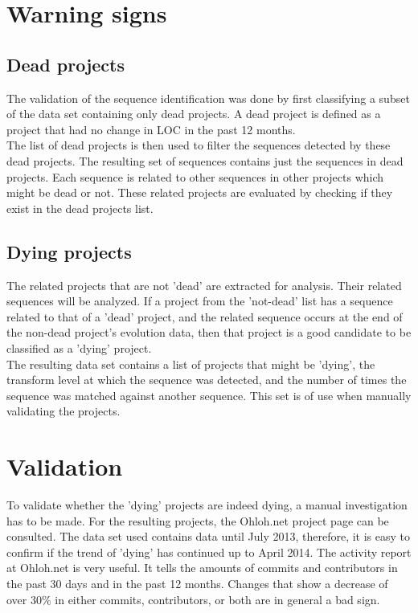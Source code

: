 \section{Warning signs}
\subsection{Dead projects}
The validation of the sequence identification was done by first classifying
a subset of the data set containing only dead projects. A dead project is
defined as a project that had no change in LOC in the past 12 months.\\

The list of dead projects is then used to filter the sequences detected by
these dead projects. The resulting set of sequences contains just the sequences
in dead projects. Each sequence is related to other sequences in other projects
which might be dead or not. These related projects are evaluated by checking if
they exist in the dead projects list.

\subsection{Dying projects}
The related projects that are not 'dead' are extracted for analysis. Their
related sequences will be analyzed. If a project from the 'not-dead' list has a
sequence related to that of a 'dead' project, and the related sequence occurs
at the end of the non-dead project's evolution data, then that project is a
good candidate to be classified as a 'dying' project.\\

The resulting data set contains a list of projects that might be 'dying', the
transform level at which the sequence was detected, and the number of times the
sequence was matched against another sequence. This set is of use when manually
validating the projects.

\section{Validation}
To validate whether the 'dying' projects are indeed dying, a manual
investigation has to be made. For the resulting projects, the Ohloh.net project
page can be consulted. The data set used contains data until July 2013,
therefore, it is easy to confirm if the trend of 'dying' has continued up to
April 2014. The activity report at Ohloh.net is very useful. It tells the
amounts of commits and contributors in the past 30 days and in the past 12
months. Changes that show a decrease of over 30\% in either commits,
contributors, or both are in general a bad sign.

